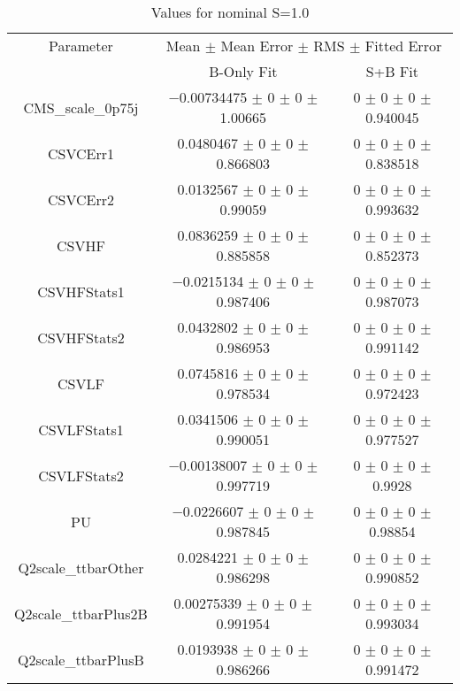 \begin{table}
\centering
\caption{Values for nominal S=1.0}
\begin{tabular}{ccc}
\toprule
Parameter & \multicolumn{2}{c}{Mean $\pm$ Mean Error $\pm$ RMS $\pm$ Fitted Error}\\
 & B-Only Fit & S+B Fit\\
\midrule
CMS\_scale\_0p75j & \num{-0.00734475} $\pm$ \num{0} $\pm$ \num{0} $\pm$ \num{1.00665} & \num{0} $\pm$ \num{0} $\pm$ \num{0} $\pm$ \num{0.940045}\\
CSVCErr1 & \num{0.0480467} $\pm$ \num{0} $\pm$ \num{0} $\pm$ \num{0.866803} & \num{0} $\pm$ \num{0} $\pm$ \num{0} $\pm$ \num{0.838518}\\
CSVCErr2 & \num{0.0132567} $\pm$ \num{0} $\pm$ \num{0} $\pm$ \num{0.99059} & \num{0} $\pm$ \num{0} $\pm$ \num{0} $\pm$ \num{0.993632}\\
CSVHF & \num{0.0836259} $\pm$ \num{0} $\pm$ \num{0} $\pm$ \num{0.885858} & \num{0} $\pm$ \num{0} $\pm$ \num{0} $\pm$ \num{0.852373}\\
CSVHFStats1 & \num{-0.0215134} $\pm$ \num{0} $\pm$ \num{0} $\pm$ \num{0.987406} & \num{0} $\pm$ \num{0} $\pm$ \num{0} $\pm$ \num{0.987073}\\
CSVHFStats2 & \num{0.0432802} $\pm$ \num{0} $\pm$ \num{0} $\pm$ \num{0.986953} & \num{0} $\pm$ \num{0} $\pm$ \num{0} $\pm$ \num{0.991142}\\
CSVLF & \num{0.0745816} $\pm$ \num{0} $\pm$ \num{0} $\pm$ \num{0.978534} & \num{0} $\pm$ \num{0} $\pm$ \num{0} $\pm$ \num{0.972423}\\
CSVLFStats1 & \num{0.0341506} $\pm$ \num{0} $\pm$ \num{0} $\pm$ \num{0.990051} & \num{0} $\pm$ \num{0} $\pm$ \num{0} $\pm$ \num{0.977527}\\
CSVLFStats2 & \num{-0.00138007} $\pm$ \num{0} $\pm$ \num{0} $\pm$ \num{0.997719} & \num{0} $\pm$ \num{0} $\pm$ \num{0} $\pm$ \num{0.9928}\\
PU & \num{-0.0226607} $\pm$ \num{0} $\pm$ \num{0} $\pm$ \num{0.987845} & \num{0} $\pm$ \num{0} $\pm$ \num{0} $\pm$ \num{0.98854}\\
Q2scale\_ttbarOther & \num{0.0284221} $\pm$ \num{0} $\pm$ \num{0} $\pm$ \num{0.986298} & \num{0} $\pm$ \num{0} $\pm$ \num{0} $\pm$ \num{0.990852}\\
Q2scale\_ttbarPlus2B & \num{0.00275339} $\pm$ \num{0} $\pm$ \num{0} $\pm$ \num{0.991954} & \num{0} $\pm$ \num{0} $\pm$ \num{0} $\pm$ \num{0.993034}\\
Q2scale\_ttbarPlusB & \num{0.0193938} $\pm$ \num{0} $\pm$ \num{0} $\pm$ \num{0.986266} & \num{0} $\pm$ \num{0} $\pm$ \num{0} $\pm$ \num{0.991472}\\

\end{tabular}
\end{table}
